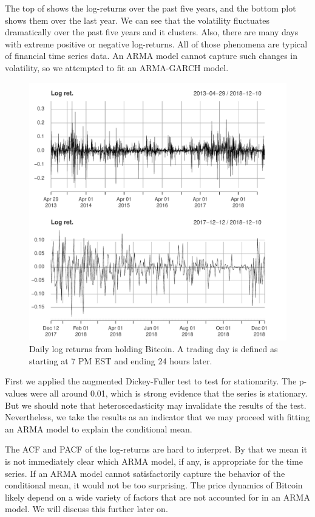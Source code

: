 \documentclass[12pt]{article}
\begin{document}
The top of  shows the log-returns over the past five years, and the bottom plot shows them over the last year. We can see that the volatility fluctuates dramatically over the past five years and it clusters. Also, there are many days with extreme positive or negative log-returns. All of those phenomena are typical of financial time series data. An ARMA model cannot capture such changes in volatility, so we attempted to fit an ARMA-GARCH model.

\begin{figure}
    \centering
    \includegraphics[width=\textwidth]{log_ret.pdf}
    \caption{Daily log returns from holding Bitcoin. A trading day is defined as starting at 7 PM EST and ending 24 hours later.}
    \label{fig:log_ret}
\end{figure}

First we applied the augmented Dickey-Fuller test to test for stationarity. The p-values were all around 0.01, which is strong evidence that the series is stationary. But we should note that heteroscedasticity may invalidate the results of the test. Nevertheless, we take the results as an indicator that we may proceed with fitting an ARMA model to explain the conditional mean.

The ACF and PACF of the log-returns are hard to interpret. By that we mean it is not immediately clear which ARMA model, if any, is appropriate for the time series. If an ARMA model cannot satisfactorily capture the behavior of the conditional mean, it would not be too surprising. The price dynamics of Bitcoin likely depend on a wide variety of factors that are not accounted for in an ARMA model. We will discuss this further later on.
\end{document}
